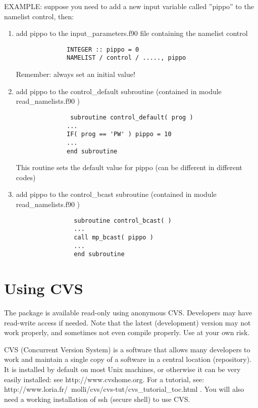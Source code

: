 \documentclass[12pt,a4paper]{article}
\begin{document}
EXAMPLE:
suppose you need to add a new input variable called ''pippo''
to the namelist control, then:

\begin{enumerate}
\item add pippo to the input\_parameters.f90 file containing the namelist control
\begin{verbatim}
              INTEGER :: pippo = 0
              NAMELIST / control / ....., pippo
\end{verbatim}
Remember: always set an initial value!

\item add pippo to the control\_default subroutine (contained in module read\_namelists.f90 )
\begin{verbatim}
               subroutine control_default( prog )
              ...
              IF( prog == 'PW' ) pippo = 10
              ...
              end subroutine
\end{verbatim}
This routine sets the default value for pippo (can be different in different codes)

\item add pippo to the control\_bcast subroutine (contained in module read\_namelists.f90 )
 \begin{verbatim}
                subroutine control_bcast( )
                ...
                call mp_bcast( pippo )
                ...
                end subroutine
\end{verbatim}
\end{enumerate}
 
\section{ Using CVS}

The package is available read-only using anonymous CVS. Developers may have read-write access if needed. Note that the latest (development) version may not work properly, and sometimes not even compile properly. Use at your own risk.

CVS (Concurrent Version System) is a software that allows many developers to work and maintain a single copy of a software in a central location (repository). It is installed by default on most Unix machines, or otherwise it can be very easily installed: see http://www.cvshome.org. For a tutorial, see:
http://www.loria.fr/~molli/cvs/cvs-tut/cvs\_tutorial\_toc.html .
You will also need a working installation of ssh (secure shell) to use CVS.
\end{document}
